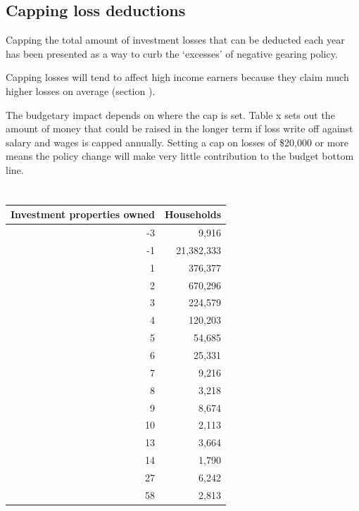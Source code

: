 \documentclass{grattan}\usepackage[]{graphicx}\usepackage[]{color}
\begin{document}
\subsection{Capping loss deductions}

Capping the total amount of investment losses that can be deducted each
year has been presented as a way to curb the `excesses' of negative
gearing policy.

Capping losses will tend to affect high income earners because they
claim much higher losses on average (section ).

The budgetary impact depends on where the cap is set. Table x sets out
the amount of money that could be raised in the longer term if loss
write off against salary and wages is capped annually. Setting a cap on
losses of \$20,000 or more means the policy change will make very little
contribution to the budget bottom line.






\section{}

\begin{table}[!h]
\begin{center}
\begin{tabular}{rr}
  \toprule
{\textbf{Investment properties owned}} & {\textbf{Households}} \\ 
  \midrule
 -3 & 9,916 \\ 
   -1 & 21,382,333 \\ 
    1 & 376,377 \\ 
    2 & 670,296 \\ 
    3 & 224,579 \\ 
    4 & 120,203 \\ 
    5 & 54,685 \\ 
    6 & 25,331 \\ 
    7 & 9,216 \\ 
    8 & 3,218 \\ 
    9 & 8,674 \\ 
   10 & 2,113 \\ 
   13 & 3,664 \\ 
   14 & 1,790 \\ 
   27 & 6,242 \\ 
   58 & 2,813 \\ 
   \bottomrule
\end{tabular}

\end{center}
\end{table}
\end{document}
